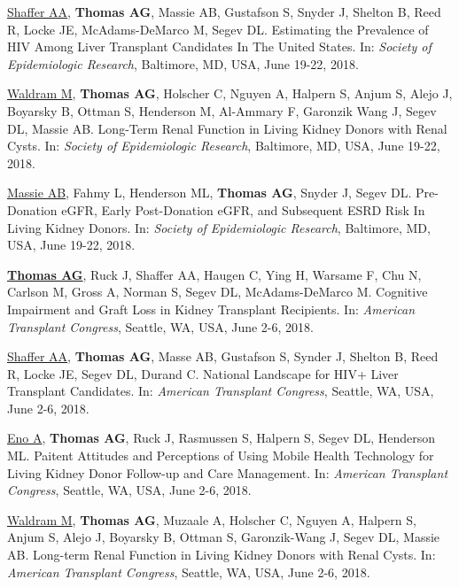 \documentclass[10pt]{article}
\makeatletter
\newlength{\bibhang}
\newlength{\bibsep}
 {\@listi \global\bibsep\itemsep \global\advance\bibsep by\parsep}
\newenvironment{bibenum*}
  {\renewcommand\labelenumi{[\theenumi]}%
   \etaremune[
     topsep=0pt,
     itemsep=\bibsep,
     parsep=0pt,partopsep=0pt,
     itemindent=-\bibhang,
     leftmargin={\bibhang+\widthof{[999]}}]}
  {\endetaremune}
\makeatother
\begin{document}
\begin{bibenum*}
\item \underline{Shaffer AA}, \textbf{Thomas AG}, Massie AB, Gustafson S,
  Snyder J, Shelton B, Reed R, Locke JE, McAdams-DeMarco M, Segev DL.
  Estimating the Prevalence of HIV Among Liver Transplant Candidates
  In The United States.
  In: \emph{Society of Epidemiologic Research},
  Baltimore, MD, USA, June 19-22, 2018.

\item \underline{Waldram M}, \textbf{Thomas AG}, Holscher C, Nguyen A,
  Halpern S, Anjum S, Alejo J, Boyarsky B, Ottman S, Henderson M,
  Al-Ammary F, Garonzik Wang J, Segev DL, Massie AB.
  Long-Term Renal Function in Living Kidney Donors with Renal Cysts.
  In: \emph{Society of Epidemiologic Research},
  Baltimore, MD, USA, June 19-22, 2018.

\item \underline{Massie AB}, Fahmy L, Henderson ML, \textbf{Thomas AG},
  Snyder J, Segev DL.
  Pre-Donation eGFR, Early Post-Donation eGFR, and Subsequent ESRD Risk
  In Living Kidney Donors.
  In: \emph{Society of Epidemiologic Research},
  Baltimore, MD, USA, June 19-22, 2018.

\item \underline{\textbf{Thomas AG}}, Ruck J, Shaffer AA, Haugen C,
  Ying H, Warsame F, Chu N, Carlson M, Gross A, Norman S, Segev DL,
  McAdams-DeMarco M.
  Cognitive Impairment and Graft Loss in Kidney Transplant Recipients.
  In: \emph{American Transplant Congress},
  Seattle, WA, USA, June 2-6, 2018.

\item \underline{Shaffer AA}, \textbf{Thomas AG}, Masse AB, Gustafson S,
  Synder J, Shelton B, Reed R, Locke JE, Segev DL, Durand C.
  National Landscape for HIV+ Liver Transplant Candidates.
  In: \emph{American Transplant Congress},
  Seattle, WA, USA, June 2-6, 2018.

\item \underline{Eno A}, \textbf{Thomas AG}, Ruck J, Rasmussen S,
  Halpern S, Segev DL, Henderson ML.
  Paitent Attitudes and Perceptions of Using Mobile Health Technology
  for Living Kidney Donor Follow-up and Care Management.
  In: \emph{American Transplant Congress},
  Seattle, WA, USA, June 2-6, 2018.

\item \underline{Waldram M}, \textbf{Thomas AG}, Muzaale A, Holscher C,
  Nguyen A, Halpern S, Anjum S, Alejo J, Boyarsky B, Ottman S,
  Garonzik-Wang J, Segev DL, Massie AB.
  Long-term Renal Function in Living Kidney Donors with Renal Cysts.
  In: \emph{American Transplant Congress},
  Seattle, WA, USA, June 2-6, 2018.


\end{bibenum*}
\end{document}
